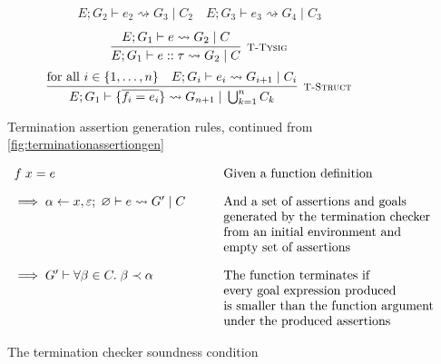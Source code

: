 \begin{figure}
\[{\begin{array}{c}
                E; G_2 \vdash e_2 \rightsquigarrow G_3\; |\; C_2
                \hspace{1em}
                E; G_3 \vdash e_3 \rightsquigarrow G_4\; |\; C_3
            \end{array}
        }
    \]
    \vspace{0.5pt}
    \[
        \infer[\textsc{\footnotesize T-Tysig}]{
            E; G_1 \vdash e :: \tau
                \rightsquigarrow G_2\; |\; C
        }{
            E; G_1 \vdash e \rightsquigarrow G_2\; |\; C
        }
    \]
    \vspace{0.5pt}
    \[
        \infer[\textsc{\footnotesize T-Struct}]{
            E; G_1 \vdash \{\overline{f_i = e_i}\}
                \rightsquigarrow G_{n+1}\; |\; \bigcup_{k = 1}^n C_k
        }{
           \text{for all } i \in \{1, \dots, n\}\quad  E; G_i \vdash e_i 
                \rightsquigarrow G_{i+1}\; |\; C_i
        }
    \]
    
    \caption{Termination assertion generation rules,
             continued from \autoref{fig:terminationassertiongen}}
    \label{fig:terminationassertiongen2}
\end{figure}


\begin{figure}
    \centering
    \[
        \begin{array}{ll}
            f\; x = e              
                & \text{Given a function definition} \\[10pt]
            \implies \alpha \leftarrow x,\varepsilon;\; \varnothing 
                \vdash e \rightsquigarrow G'\; |\; C
                \hspace{2em}
                & \text{And a set of assertions and goals} \\
                & \text{generated by the termination checker} \\
                & \text{from an initial environment and} \\
                & \text{empty set of assertions} \\[10pt]
            \implies G' \vdash \forall \beta \in C.\; \beta \prec \alpha
                & \text{The function terminates if} \\
                & \text{every goal expression produced} \\
                & \text{is smaller than the function argument} \\
                & \text{under the produced assertions}
        \end{array}
    \]
    
    \caption{The termination checker soundness condition}
    \label{fig:terminationcondition}
\end{figure}

